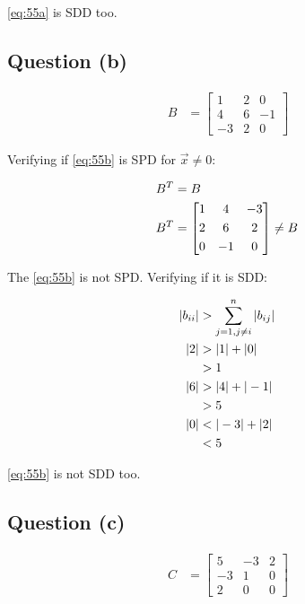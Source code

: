 		\cref{eq:55a} is SDD too.

	\subsection{Question (b)}
		\begin{align}
			B &= \begin{bmatrix}
					1 & 2 & 0 \\[0.3em]
					4 & 6 & -1 \\[0.3em]
					-3 & 2 & 0
				\end{bmatrix}&
		\label{eq:55b}
		\end{align}

		Verifying if \cref{eq:55b} is SPD for $\vec{x} \neq 0$:

		\begin{align}
			B^{T} &= B& \notag \\
			B^{T} &= \begin{bmatrix}
					1 & 4 & -3 \\[0.3em]
					2 & 6 & 2 \\[0.3em]
					0 & -1 & 0
				\end{bmatrix} \neq B&
		\label{eq:55bt}
		\end{align}

		The \cref{eq:55b} is not SPD. Verifying if it is SDD:

		\begin{align}
			\left|b_{ii}\right| &> \sum_{j=1,j \neq i}^{n} \left|b_{ij}\right|& \\
			|2| &> |1| + |0|& \notag \\
			&> 1 & \\
			|6| &> |4| + |-1|& \notag \\
			&> 5 & \\
			|0| &< |-3| + |2|& \notag \\
			&< 5&
 		\label{eq:55bsdd}
		\end{align}

		\cref{eq:55b} is not SDD too.

	\subsection{Question (c)}
		\begin{align}
			C &= \begin{bmatrix}
					5 & -3 & 2 \\[0.3em]
					-3 & 1 & 0 \\[0.3em]
					2 & 0 & 0
				\end{bmatrix}&
		\label{eq:55c}
		\end{align}

